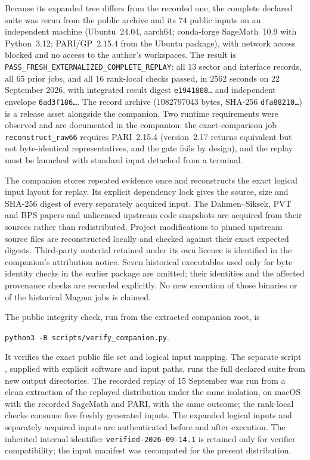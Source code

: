 \documentclass[11pt]{article}
\theoremstyle{definition}
\theoremstyle{remark}
\begin{document}
Because its expanded tree differs from the recorded one, the complete
declared suite was rerun from the public archive and its $74$ public
inputs on an independent machine (Ubuntu~24.04, aarch64; conda-forge
SageMath~10.9 with Python~3.12; PARI/GP~2.15.4 from the Ubuntu
package), with network access blocked and no access to the author's
workspaces.  The result is
\texttt{PASS\_FRESH\_EXTERNALIZED\_COMPLETE\_REPLAY}: all $13$ sector and
interface records, all $65$ prior jobs, and all $16$ rank-local checks
passed, in $2562$ seconds on 22 September 2026, with integrated result
digest \texttt{e1941808\ldots} and independent envelope
\texttt{6ad3f186\ldots}.  The record archive
(1082797043 bytes, SHA-256 \texttt{dfa88210\ldots}) is a release asset
alongside the companion.  Two runtime requirements were observed and
are documented in the companion: the exact-comparison job
\texttt{reconstruct\_raw66} requires PARI~2.15.4 (version~2.17
returns equivalent but not byte-identical representatives, and the
gate fails by design), and the replay must be launched with standard
input detached from a terminal.

The companion stores repeated evidence once and reconstructs the exact
logical input layout for replay. Its explicit dependency lock gives the
source, size and SHA-256 digest of every separately acquired input.
The Dahmen--Siksek, PVT and BPS papers and unlicensed upstream code
snapshots are acquired from their sources rather than redistributed.
Project modifications to pinned upstream source files are reconstructed
locally and checked against their exact expected digests. Third-party
material retained under its own licence is identified in the companion's
attribution notice. Seven historical executables used only for byte
identity checks in the earlier package are omitted; their identities and
the affected provenance checks are recorded explicitly. No new execution
of those binaries or of the historical Magma jobs is claimed.

The public integrity check, run from the extracted companion root, is
\begin{center}
\texttt{python3 -B scripts/verify\_companion.py}.
\end{center}
It verifies the exact public file set and logical input mapping.
The separate script , supplied with
explicit software and input paths, runs the full declared suite from
new output directories. The recorded replay of 15 September was run from a clean
extraction of the replayed distribution under the same isolation, on
macOS with the recorded SageMath and PARI, with the same outcome; the
rank-local checks consume five freshly generated inputs.  The expanded
logical inputs and separately acquired inputs are authenticated before
and after execution.
The inherited internal identifier \texttt{verified-2026-09-14.1} is
retained only for verifier compatibility; the input manifest was
recomputed for the present distribution.
\end{document}
